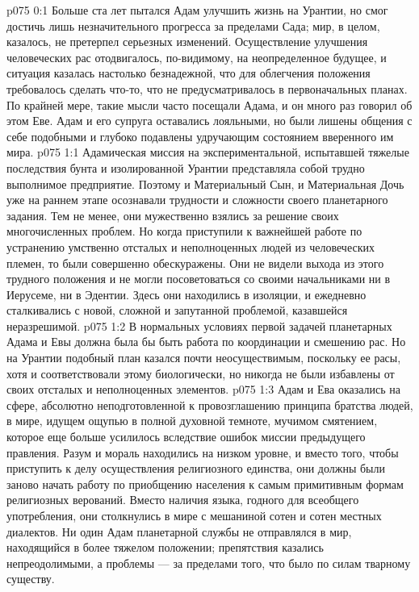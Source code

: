 \author{Солония}
\vs p075 0:1 Больше ста лет пытался Адам улучшить жизнь на Урантии, но смог достичь лишь незначительного прогресса за пределами Сада; мир, в целом, казалось, не претерпел серьезных изменений. Осуществление улучшения человеческих рас отодвигалось, по\hyp{}видимому, на неопределенное будущее, и ситуация казалась настолько безнадежной, что для облегчения положения требовалось сделать что\hyp{}то, что не предусматривалось в первоначальных планах. По крайней мере, такие мысли часто посещали Адама, и он много раз говорил об этом Еве. Адам и его супруга оставались лояльными, но были лишены общения с себе подобными и глубоко подавлены удручающим состоянием вверенного им мира.
\vs p075 1:1 Адамическая миссия на экспериментальной, испытавшей тяжелые последствия бунта и изолированной Урантии представляла собой трудно выполнимое предприятие. Поэтому и Материальный Сын, и Материальная Дочь уже на раннем этапе осознавали трудности и сложности своего планетарного задания. Тем не менее, они мужественно взялись за решение своих многочисленных проблем. Но когда приступили к важнейшей работе по устранению умственно отсталых и неполноценных людей из человеческих племен, то были совершенно обескуражены. Они не видели выхода из этого трудного положения и не могли посоветоваться со своими начальниками ни в Иерусеме, ни в Эдентии. Здесь они находились в изоляции, и ежедневно сталкивались с новой, сложной и запутанной проблемой, казавшейся неразрешимой.
\vs p075 1:2 В нормальных условиях первой задачей планетарных Адама и Евы должна была бы быть работа по координации и смешению рас. Но на Урантии подобный план казался почти неосуществимым, поскольку ее расы, хотя и соответствовали этому биологически, но никогда не были избавлены от своих отсталых и неполноценных элементов.
\vs p075 1:3 Адам и Ева оказались на сфере, абсолютно неподготовленной к провозглашению принципа братства людей, в мире, идущем ощупью в полной духовной темноте, мучимом смятением, которое еще больше усилилось вследствие ошибок миссии предыдущего правления. Разум и мораль находились на низком уровне, и вместо того, чтобы приступить к делу осуществления религиозного единства, они должны были заново начать работу по приобщению населения к самым примитивным формам религиозных верований. Вместо наличия языка, годного для всеобщего употребления, они столкнулись в мире с мешаниной сотен и сотен местных диалектов. Ни один Адам планетарной службы не отправлялся в мир, находящийся в более тяжелом положении; препятствия казались непреодолимыми, а проблемы --- за пределами того, что было по силам тварному существу.
